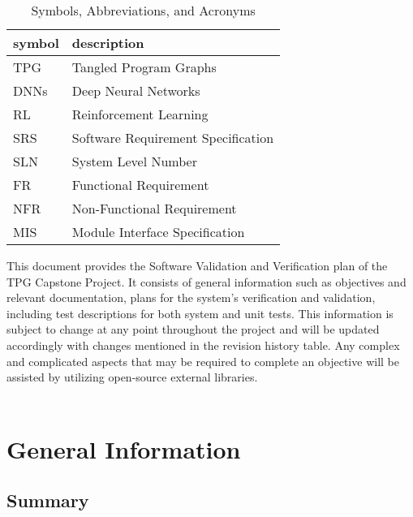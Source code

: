 \documentclass[12pt, titlepage]{article}
\begin{document}
\renewcommand{\arraystretch}{1.2}
\begin{table}[h]
  \begin{tabular}{l l} 
    \toprule		
    \textbf{symbol} & \textbf{description}\\
    \midrule 
    TPG & Tangled Program Graphs\\
    DNNs & Deep Neural Networks\\
    RL & Reinforcement Learning\\
    SRS & Software Requirement Specification\\
    SLN & System Level Number\\
    FR & Functional Requirement\\
    NFR & Non-Functional Requirement\\
    MIS & Module Interface Specification\\
    \bottomrule
  \end{tabular}
  \caption{Symbols, Abbreviations, and Acronyms}
  \label{symbols}
\end{table}




\newpage


This document provides the Software Validation and Verification plan of the TPG Capstone Project. It consists of general information such as objectives and relevant documentation, plans for the system's verification and validation, including test descriptions for both system and unit tests. This information is subject to change at any point throughout the project and will be updated accordingly with changes mentioned in the revision history table.
Any complex and complicated aspects that may be required to complete an objective will be assisted by utilizing open-source external libraries.\\\\

\section{General Information}

\subsection{Summary}
\end{document}
